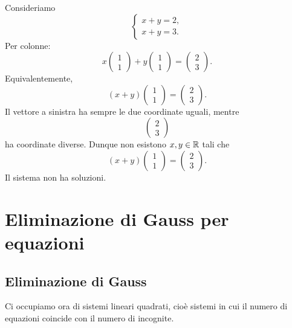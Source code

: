 \documentclass[a4paper]{article}
\begin{document}
Consideriamo
\[
    \begin{cases}
        x+y=2,\\
        x+y=3.
    \end{cases}
\]
Per colonne:
\[
    x
    \begin{pmatrix}
        1\\
        1
    \end{pmatrix}
    +
    y
    \begin{pmatrix}
        1\\
        1
    \end{pmatrix}
    =
    \begin{pmatrix}
        2\\
        3
    \end{pmatrix}.
\]
Equivalentemente,
\[
    (x+y)
    \begin{pmatrix}
        1\\
        1
    \end{pmatrix}
    =
    \begin{pmatrix}
        2\\
        3
    \end{pmatrix}.
\]
Il vettore a sinistra ha sempre le due coordinate uguali, mentre
\[
    \begin{pmatrix}
        2\\
        3
    \end{pmatrix}
\]
ha coordinate diverse. Dunque non esistono \(x,y\in\mathbb{R}\) tali che
\[
    (x+y)
    \begin{pmatrix}
        1\\
        1
    \end{pmatrix}
    =
    \begin{pmatrix}
        2\\
        3
    \end{pmatrix}.
\]
Il sistema non ha soluzioni.

\section{Eliminazione di Gauss per equazioni}

\subsection{Eliminazione di Gauss}

Ci occupiamo ora di sistemi lineari quadrati, cioè sistemi in cui il numero di equazioni coincide con il numero di incognite.
\end{document}
